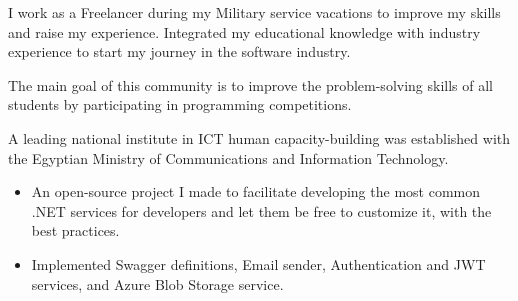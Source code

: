 \documentclass[10pt,a4paper,ragged2e,withhyper]{altacv}
\begin{document}
\begin{paracol}{2}



\divider



I work as a Freelancer during my Military service vacations to improve my skills and raise my experience. Integrated my educational knowledge with industry experience to start my journey in the software industry.

\divider

The main goal of this community is to improve the problem-solving skills of all students by participating in programming competitions.

\divider

A leading national institute in ICT human capacity-building was established with the Egyptian Ministry of Communications and Information Technology.


\begin{itemize}
\item An open-source project I made to facilitate developing the most common .NET services for developers and let them be free to customize it, with the best practices.
\item Implemented Swagger definitions, Email sender, Authentication and JWT services, and Azure Blob Storage service.
\end{itemize}


\end{paracol}
\end{document}
